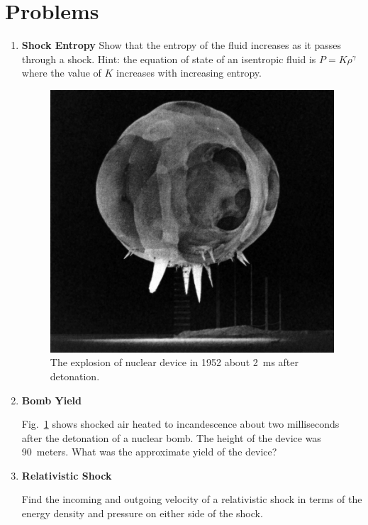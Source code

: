 \section{Problems}
\begin{enumerate}

\item{\bf Shock Entropy}
  Show that the entropy of the fluid increases as it passes
  through a shock. Hint: the equation of state of an isentropic fluid
  is $P = K\rho^\gamma$ where the value of $K$ increases with
  increasing entropy.

\begin{figure}
\includegraphics[width=\textwidth]{Tumbler_Snapper_rope_tricks.jpg}  
\caption{The explosion of nuclear device in 1952 about 2~ms after detonation.}
\label{fig:tumbler}
\end{figure}

\item{\bf Bomb Yield}

  Fig.~\ref{fig:tumbler} shows shocked air heated to incandescence
  about two milliseconds after the detonation of a nuclear
  bomb.  The height of the device was 90~meters.  What
  was the approximate yield of the device?

\item{\bf Relativistic Shock}

  Find the incoming and outgoing velocity of a relativistic shock in
  terms of the energy density and pressure on either side of the
  shock.


\end{enumerate}
